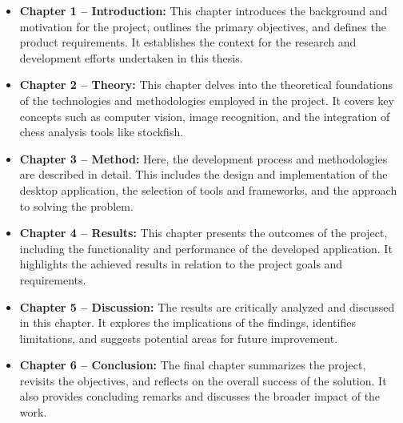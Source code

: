 \begin{itemize}
    \item \textbf{Chapter 1 -- Introduction:} This chapter introduces the background and motivation for the project, outlines the primary objectives, and defines the product requirements. It establishes the context for the research and development efforts undertaken in this thesis.
    
    \item \textbf{Chapter 2 -- Theory:} This chapter delves into the theoretical foundations of the technologies and methodologies employed in the project. It covers key concepts such as computer vision, image recognition, and the integration of chess analysis tools like \gls{stockfish}.
    
    \item \textbf{Chapter 3 -- Method:} Here, the development process and methodologies are described in detail. This includes the design and implementation of the desktop application, the selection of tools and frameworks, and the approach to solving the problem.
    
    \item \textbf{Chapter 4 -- Results:} This chapter presents the outcomes of the project, including the functionality and performance of the developed application. It highlights the achieved results in relation to the project goals and requirements.
    
    \item \textbf{Chapter 5 -- Discussion:} The results are critically analyzed and discussed in this chapter. It explores the implications of the findings, identifies limitations, and suggests potential areas for future improvement.
    
    \item \textbf{Chapter 6 -- Conclusion:} The final chapter summarizes the project, revisits the objectives, and reflects on the overall success of the solution. It also provides concluding remarks and discusses the broader impact of the work.
\end{itemize}



